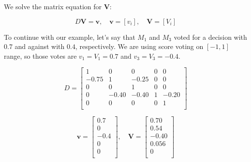 \documentclass{sigchi}
\begin{document}
We solve the matrix equation for $\boldsymbol{V}$:

\begin{displaymath}
D \boldsymbol{V} = \boldsymbol{v},\quad \boldsymbol{v} = \left[v_{i}\right],\quad \boldsymbol{V} = \left[V_{i}\right]
\end{displaymath}

To continue with our example, let's say that $M_1$ and $M_3$ voted for a decision with $0.7$ and against with $0.4$,
respectively.
We are using score voting on $[-1, 1]$ range, so those votes are $v_1 = V_1 = 0.7$ and
$v_3 = V_3 = -0.4$.

\begin{displaymath}
D = \left[ \begin{array}{ccccc}
1 & 0 & 0 & 0 & 0 \\
-0.75 & 1 & -0.25 & 0 & 0 \\
0 & 0 & 1 & 0 & 0 \\
0 & -0.40 & -0.40 & 1 & -0.20 \\
0 & 0 & 0 & 0 & 1 \\
\end{array} \right]
\end{displaymath}

\begin{displaymath}
\boldsymbol{v} = \left[ \begin{array}{c}
0.7 \\
0 \\
-0.4 \\
0 \\
0 \\
\end{array} \right],\quad \boldsymbol{V} = \left[ \begin{array}{c}
0.70 \\
0.54 \\
-0.40 \\
0.056 \\
0 \\
\end{array} \right]
\end{displaymath}

\end{document}
